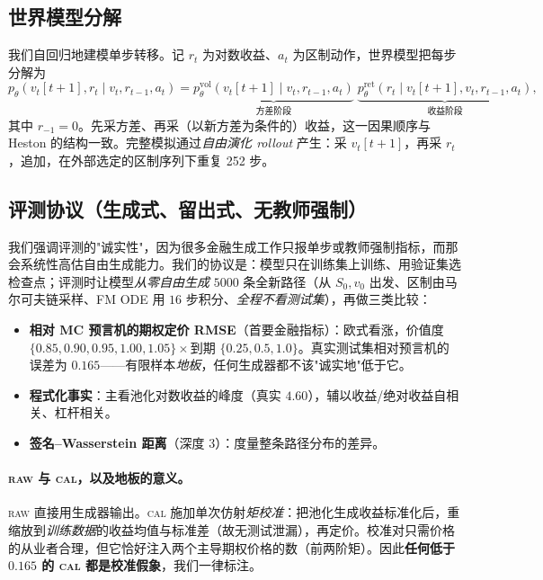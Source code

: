 \documentclass[11pt]{ctexart}
\newcommand{\raw}{\textsc{raw}}
\renewcommand{\cal}{\textsc{cal}}
\newcommand{\vt}{v_t}
\begin{document}
\subsection{世界模型分解}
我们自回归地建模单步转移。记 $r_t$ 为对数收益、$a_t$ 为区制动作，世界模型把每步分解为
\begin{equation}
p_\theta(\vt[t{+}1], r_t \mid \vt, r_{t-1}, a_t)
= \underbrace{p^{\mathrm{vol}}_\theta(\vt[t{+}1]\mid \vt, r_{t-1}, a_t)}_{\text{方差阶段}}\;
  \underbrace{p^{\mathrm{ret}}_\theta(r_t\mid \vt[t{+}1], \vt, r_{t-1}, a_t)}_{\text{收益阶段}} ,
\end{equation}
其中 $r_{-1}{=}0$。先采方差、再采（以新方差为条件的）收益，这一因果顺序与 Heston 的结构一致。完整模拟通过\emph{自由演化 rollout} 产生：采 $\vt[t+1]$，再采 $r_t$，追加，在外部选定的区制序列下重复 252 步。

\subsection{评测协议（生成式、留出式、无教师强制）}
\label{sec:eval}
我们强调评测的"诚实性"，因为很多金融生成工作只报单步或教师强制指标，而那会系统性高估自由生成能力。我们的协议是：模型只在训练集上训练、用验证集选检查点；评测时让模型\emph{从零自由生成} $5000$ 条全新路径（从 $S_0,v_0$ 出发、区制由马尔可夫链采样、FM ODE 用 $16$ 步积分、\emph{全程不看测试集}），再做三类比较：
\begin{itemize}\itemsep2pt
\item \textbf{相对 MC 预言机的期权定价 RMSE}（首要金融指标）：欧式看涨，价值度 $\{0.85,0.90,0.95,1.00,1.05\}\times$到期 $\{0.25,0.5,1.0\}$。真实测试集相对预言机的误差为 $\mathbf{0.165}$——有限样本\emph{地板}，任何生成器都不该"诚实地"低于它。
\item \textbf{程式化事实}：主看池化对数收益的峰度（真实 $\mathbf{4.60}$），辅以收益/绝对收益自相关、杠杆相关。
\item \textbf{签名–Wasserstein 距离}（深度 3）：度量整条路径分布的差异。
\end{itemize}

\paragraph{\raw{} 与 \cal{}，以及地板的意义。}
\raw{} 直接用生成器输出。\cal{} 施加单次仿射\emph{矩校准}：把池化生成收益标准化后，重缩放到\emph{训练数据}的收益均值与标准差（故无测试泄漏），再定价。校准对只需价格的从业者合理，但它恰好注入两个主导期权价格的数（前两阶矩）。因此\textbf{任何低于 $0.165$ 的 \cal{} 都是校准假象}，我们一律标注。
\end{document}
